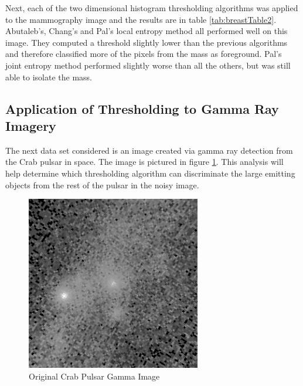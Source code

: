 \documentclass[journal]{IEEEtran}
\begin{document}
\par Next, each of the two dimensional histogram thresholding algorithms was applied to the mammography image and the results are in table \ref{tab:breastTable2}. Abutaleb's, Chang's and Pal's local entropy method all performed well on this image. They computed a threshold slightly lower than the previous algorithms and therefore classified more of the pixels from the mass as foreground. Pal's joint entropy method performed slightly worse than all the others, but was still able to isolate the mass.

\subsection{Application of Thresholding to Gamma Ray Imagery}
\par The next data set considered is an image created via gamma ray detection from the Crab pulsar in space. The image is pictured in figure \ref{fig:gamma}. This analysis will help determine which thresholding algorithm can discriminate the large emitting objects from the rest of the pulsar in the noisy image.

\begin{figure}[!h]
\centering
\includegraphics[width=3in]{../images/crabpulsar-gamma.png}
\caption{Original Crab Pulsar Gamma Image}
\label{fig:gamma}
\end{figure}
\end{document}
